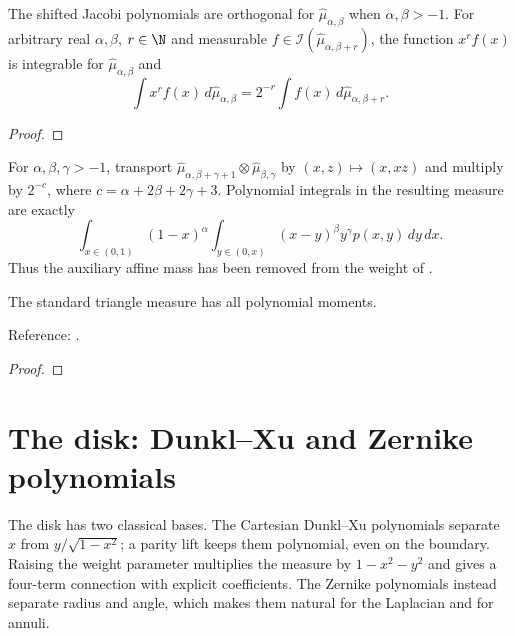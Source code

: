 \begin{supporting}
\begin{theorem}
\leanok
The shifted Jacobi polynomials are orthogonal for $\widehat\mu_{\alpha,\beta}$ when $\alpha,\beta>-1$. For arbitrary real $\alpha,\beta$, $r\in\N$ and measurable $f\in\mathcal I(\widehat\mu_{\alpha,\beta+r})$, the function $x^rf(x)$ is integrable for $\widehat\mu_{\alpha,\beta}$ and
\[\int x^rf(x)\,d\widehat\mu_{\alpha,\beta}=2^{-r}\int f(x)\,d\widehat\mu_{\alpha,\beta+r}.\]
\end{theorem}
\begin{proof}
\leanok
\end{proof}

\begin{theorem}
\label{thm:proriol-triangle-measure}
\leanok
For $\alpha,\beta,\gamma>-1$, transport
$\widehat\mu_{\alpha,\beta+\gamma+1}\otimes\widehat\mu_{\beta,\gamma}$
by $(x,z)\mapsto(x,xz)$ and multiply by $2^{-c}$, where
$c=\alpha+2\beta+2\gamma+3$. Polynomial integrals in the resulting measure are exactly
\[
 \int_{x\in(0,1)}(1-x)^\alpha\!\int_{y\in(0,x)}(x-y)^\beta y^\gamma p(x,y)\,dy\,dx.
\]
Thus the auxiliary affine mass has been removed from the weight of \cite[18.37.8]{dlmf}.

The standard triangle measure has all polynomial moments.

Reference: \cite[18.37.8]{dlmf}.
\end{theorem}
\begin{proof}
\leanok
\end{proof}

\end{supporting}

\section{The disk: Dunkl--Xu and Zernike polynomials}\label{sec:disk}

The disk has two classical bases. The Cartesian Dunkl--Xu polynomials separate
$x$ from $y/\sqrt{1-x^2}$; a parity lift keeps them polynomial, even on the
boundary. Raising the weight parameter multiplies the measure by $1-x^2-y^2$
and gives a four-term connection with explicit coefficients. The Zernike
polynomials instead separate radius and angle, which makes them natural for
the Laplacian and for annuli.

